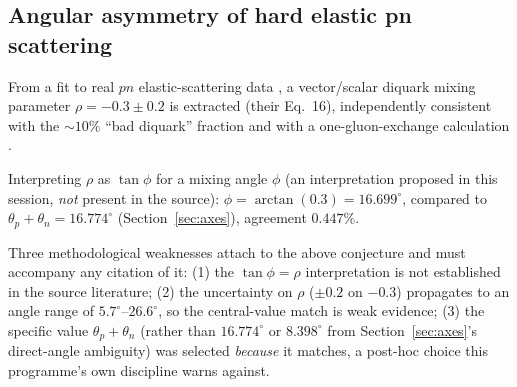 \documentclass[11pt]{article}
\def\texorpdfstring#1#2{#2}%
\begin{document}
\subsection{Angular asymmetry of hard elastic \texorpdfstring{$pn$}{pn} scattering}
From a fit to real $pn$ elastic-scattering data \citep{Granados2009}, a vector/scalar diquark mixing parameter $\rho=-0.3\pm0.2$ is extracted (their Eq.~16), independently consistent with the $\sim10\%$ ``bad diquark'' fraction \citep{Selem2006} and with a one-gluon-exchange calculation \citep{Jaffe2005}.

\begin{conjecturebox}
Interpreting $\rho$ as $\tan\phi$ for a mixing angle $\phi$ (an interpretation proposed in this session, \emph{not} present in the source): $\phi=\arctan(0.3)=16.699^\circ$, compared to $\theta_p+\theta_n=16.774^\circ$ (Section~\ref{sec:axes}), agreement $0.447\%$.
\end{conjecturebox}

\begin{negativebox}
Three methodological weaknesses attach to the above conjecture and must accompany any citation of it: (1) the $\tan\phi=\rho$ interpretation is not established in the source literature; (2) the uncertainty on $\rho$ ($\pm0.2$ on $-0.3$) propagates to an angle range of $5.7^\circ$--$26.6^\circ$, so the central-value match is weak evidence; (3) the specific value $\theta_p+\theta_n$ (rather than $16.774^\circ$ or $8.398^\circ$ from Section~\ref{sec:axes}'s direct-angle ambiguity) was selected \emph{because} it matches, a post-hoc choice this programme's own discipline warns against.
\end{negativebox}
\end{document}
